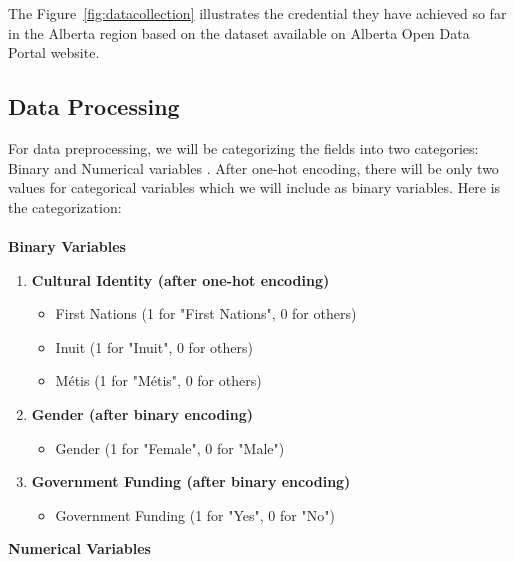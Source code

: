 \documentclass[final,12p,twocolumn]{article}
\begin{document}
The Figure~\ref{fig:datacollection} illustrates the credential they have achieved so far in the Alberta region based on the dataset available on Alberta Open Data Portal website.





\subsection{Data Processing}
For data preprocessing, we will be categorizing the fields into two categories:
Binary and Numerical variables \cite{r16}. After one-hot encoding, there will be
only two values for categorical variables which we will include as binary
variables. Here is the categorization:
\\
\\\textbf{Binary Variables}
\begin{enumerate}[itemsep=0pt, parsep=0pt, topsep=0pt, partopsep=0pt]
    \item \textbf{Cultural Identity (after one-hot encoding)}  
\begin{itemize}[itemsep=0pt, parsep=0pt, topsep=0pt, partopsep=0pt]
  \item First Nations (1 for "First Nations", 0 for others)
  \item Inuit (1 for "Inuit", 0 for others)
  \item Métis (1 for "Métis", 0 for others)
\end{itemize}

    \item \textbf{Gender (after binary encoding)}  
\begin{itemize}[itemsep=0pt, parsep=0pt, topsep=0pt, partopsep=0pt]
  \item Gender (1 for "Female", 0 for "Male") 
\end{itemize}

    \item \textbf{Government Funding (after binary encoding)}  
\begin{itemize}[itemsep=0pt, parsep=0pt, topsep=0pt, partopsep=0pt]
  \item Government Funding (1 for "Yes", 0 for "No")
\end{itemize}
\end{enumerate}
\textbf{Numerical Variables}
\end{document}

